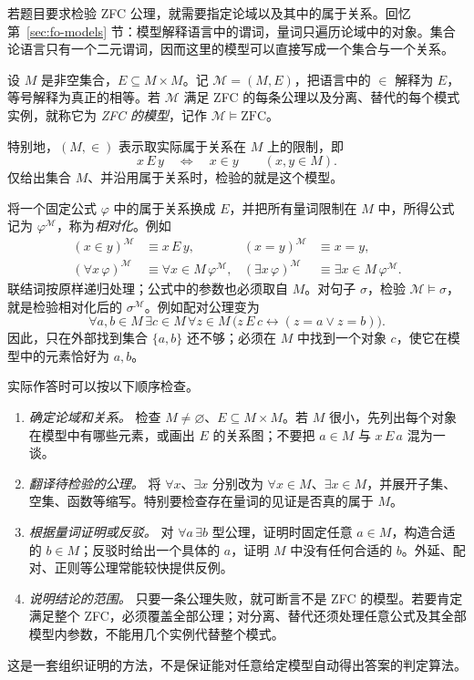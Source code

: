 \documentclass[lang=cn,a4paper,fontset=none,zihao=false,10pt,openany,twoside]{beautybook}
\numberwithin{algorithm}{chapter}
\begin{document}
若题目要求检验 ZFC 公理，就需要指定论域以及其中的属于关系。回忆第~\ref{sec:fo-models} 节：模型解释语言中的谓词，量词只遍历论域中的对象。集合论语言只有一个二元谓词，因而这里的模型可以直接写成一个集合与一个关系。
\begin{definition}[集合论模型]\label{def:zfc-model-check}
设 $M$ 是非空集合，$E\subseteq M\times M$。记 $\mathcal M=(M,E)$，把语言中的 $\in$ 解释为 $E$，等号解释为真正的相等。若 $\mathcal M$ 满足 ZFC 的每条公理以及分离、替代的每个模式实例，就称它为 \emph{ZFC 的模型}，记作 $\mathcal M\models\mathrm{ZFC}$。

特别地，$(M,\in)$ 表示取实际属于关系在 $M$ 上的限制，即
\[
 x\,E\,y\quad\Longleftrightarrow\quad x\in y
 \qquad(x,y\in M).
\]
仅给出集合 $M$、并沿用属于关系时，检验的就是这个模型。
\end{definition}

将一个固定公式 $\varphi$ 中的属于关系换成 $E$，并把所有量词限制在 $M$ 中，所得公式记为 $\varphi^{\mathcal M}$，称为\emph{相对化}。例如
\[
 \begin{aligned}
 (x\in y)^{\mathcal M}&\equiv x\,E\,y,
 & (x=y)^{\mathcal M}&\equiv x=y,\\
 (\forall x\,\varphi)^{\mathcal M}
   &\equiv\forall x\in M\,\varphi^{\mathcal M},
 & (\exists x\,\varphi)^{\mathcal M}
   &\equiv\exists x\in M\,\varphi^{\mathcal M}.
 \end{aligned}
\]
联结词按原样递归处理；公式中的参数也必须取自 $M$。对句子 $\sigma$，检验 $\mathcal M\models\sigma$，就是检验相对化后的 $\sigma^{\mathcal M}$。例如配对公理变为
\[
 \forall a,b\in M\,\exists c\in M\,\forall z\in M\,
 \bigl(z\,E\,c\leftrightarrow(z=a\vee z=b)\bigr).
\]
因此，只在外部找到集合 $\{a,b\}$ 还不够；必须在 $M$ 中找到一个对象 $c$，使它在模型中的元素恰好为 $a,b$。

实际作答时可以按以下顺序检查。
\begin{enumerate}[(1)]
\item \emph{确定论域和关系。} 检查 $M\ne\varnothing$、$E\subseteq M\times M$。若 $M$ 很小，先列出每个对象在模型中有哪些元素，或画出 $E$ 的关系图；不要把 $a\in M$ 与 $x\,E\,a$ 混为一谈。
\item \emph{翻译待检验的公理。} 将 $\forall x$、$\exists x$ 分别改为 $\forall x\in M$、$\exists x\in M$，并展开子集、空集、函数等缩写。特别要检查存在量词的见证是否真的属于 $M$。
\item \emph{根据量词证明或反驳。} 对 $\forall a\,\exists b$ 型公理，证明时固定任意 $a\in M$，构造合适的 $b\in M$；反驳时给出一个具体的 $a$，证明 $M$ 中没有任何合适的 $b$。外延、配对、正则等公理常能较快提供反例。
\item \emph{说明结论的范围。} 只要一条公理失败，就可断言不是 ZFC 的模型。若要肯定满足整个 ZFC，必须覆盖全部公理；对分离、替代还须处理任意公式及其全部模型内参数，不能用几个实例代替整个模式。
\end{enumerate}
这是一套组织证明的方法，不是保证能对任意给定模型自动得出答案的判定算法。
\end{document}
